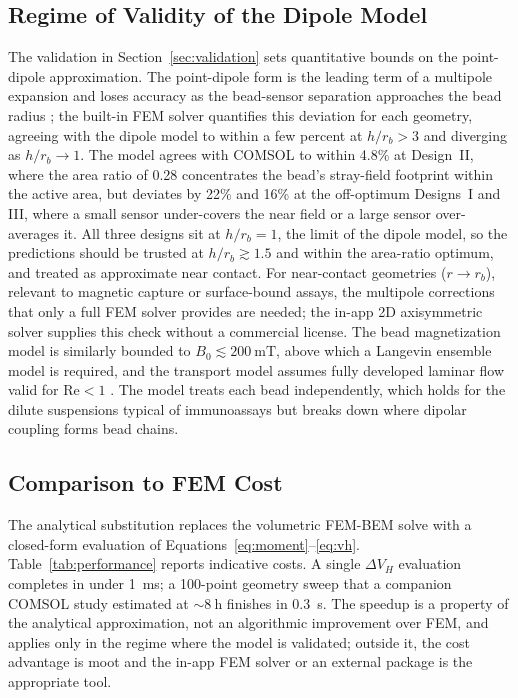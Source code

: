 \documentclass[micromachines,article,submit,pdftex,moreauthors]{Definitions/mdpi}
\begin{document}
\subsection{Regime of Validity of the Dipole Model}

The validation in Section~\ref{sec:validation} sets quantitative bounds on the
point-dipole approximation. The point-dipole form is the leading term of a
multipole expansion and loses accuracy as the bead-sensor separation approaches
the bead radius \cite{griffiths}; the built-in FEM solver quantifies this
deviation for each geometry, agreeing with the dipole model to within a few
percent at $h/r_b > 3$ and diverging as $h/r_b \to 1$. The model agrees with
COMSOL to within 4.8\% at Design~II, where the area ratio of 0.28 concentrates the
bead's stray-field footprint within the active area, but deviates by 22\% and 16\% at
the off-optimum Designs~I and III, where a small sensor under-covers the near field or
a large sensor over-averages it. All three designs sit at $h/r_b = 1$, the limit of the
dipole model, so the predictions should be trusted at $h/r_b \gtrsim 1.5$ and within the
area-ratio optimum, and treated as approximate near contact. For near-contact
geometries ($r \to r_b$), relevant to magnetic capture or surface-bound assays, the
multipole corrections that only a full FEM solver provides are needed; the in-app 2D
axisymmetric solver supplies this check without a commercial license. The bead
magnetization model is similarly bounded to $B_0 \lesssim \SI{200}{\milli\tesla}$,
above which a Langevin ensemble model is required, and the transport model assumes
fully developed laminar flow valid for $\text{Re} < 1$ \cite{hewlin2023}. The model
treats each bead independently, which holds for the dilute suspensions typical of
immunoassays but breaks down where dipolar coupling forms bead chains.

\subsection{Comparison to FEM Cost}

The analytical substitution replaces the volumetric FEM-BEM solve with a closed-form
evaluation of Equations~\eqref{eq:moment}--\eqref{eq:vh}.
Table~\ref{tab:performance} reports indicative costs. A single $\Delta V_H$ evaluation
completes in under \SI{1}{\milli\second}; a 100-point geometry sweep that a companion
COMSOL study estimated at ${\sim}\SI{8}{\hour}$ \cite{govindaraju2025} finishes in
\SI{0.3}{\second}. The speedup is a property of the analytical approximation, not an
algorithmic improvement over FEM, and applies only in the regime where the model is
validated; outside it, the cost advantage is moot and the in-app FEM solver or an
external package is the appropriate tool.
\end{document}
